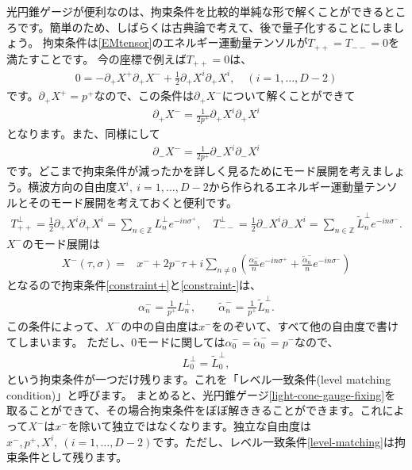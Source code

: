 \documentclass[report,paper=a4, fontsize=12pt, line_length=16cm, number_of_lines=33,dvipdfmx]{jlreq}
\numberwithin{equation}{chapter}
\numberwithin{equation}{section}
\newcommand{\Zb}{\mathbb{Z}}
\newcommand{\del}{\partial}
\newcommand{\alphat}{\tilde{\alpha}}
\newcommand{\Lp}{L^{\perp}}
\newcommand{\Ltp}{\widetilde{L}^{\perp}}
\begin{document}
光円錐ゲージが便利なのは、拘束条件を比較的単純な形で解くことができるところです。簡単のため、しばらくは古典論で考えて、後で量子化することにしましょう。
拘束条件は\eqref{EMtensor}のエネルギー運動量テンソルが$T_{++}=T_{--}=0$を満たすことです。
今の座標で例えば$T_{++}=0$は、
\begin{align}
0=-\del_{+}X^{+}\del_{+}X^{-}+\frac12 \del_{+}X^{i}\del_{+}X^{i},\quad(i=1,\dots,D-2)
\end{align}
です。$\del_{+}X^{+}=p^{+}$なので、この条件は$\del_{+}X^{-}$について解くことができて
\begin{align}
\del_{+}X^{-}=\frac{1}{2p^{+}}\del_{+}X^{i}\del_{+}X^{i}
\label{constraint+}
\end{align}
となります。また、同様にして
\begin{align}
\del_{-}X^{-}=\frac{1}{2p^{+}}\del_{-}X^{i}\del_{-}X^{i}
\label{constraint-}
\end{align}
です。どこまで拘束条件が減ったかを詳しく見るためにモード展開を考えましょう。横波方向の自由度$X^{i},\ i=1,\dots, D-2$から作られるエネルギー運動量テンソルとそのモード展開を考えておくと便利です。
\begin{align}
T^{\perp}_{++}=\frac{1}{2}\del_{+}X^{i}\del_{+}X^{i}=\sum_{n\in\Zb}\Lp_{n}e^{-in\sigma^{+}},\quad
T^{\perp}_{--}=\frac{1}{2}\del_{-}X^{i}\del_{-}X^{i}=\sum_{n\in\Zb}\Ltp_{n}e^{-in\sigma^{-}}.
\end{align}
$X^{-}$のモード展開は
\begin{align}
X^{-}(\tau,\sigma)=&x^{-}+2p^{-}\tau+i\sum_{n\ne 0} \left(
\frac{\alpha^{-}_{n}}{n}e^{-in\sigma^{+}}
+\frac{\alphat^{-}_{n}}{n}e^{-in\sigma^{-}}
\right)
\end{align}
となるので拘束条件\eqref{constraint+}と\eqref{constraint-}は、
\begin{align}
\alpha_n^{-}=\frac{1}{p^{+}} \Lp_{n},\qquad
\alphat_n^{-}=\frac{1}{p^{+}} \Ltp_{n}.\label{solution-constraint}
\end{align}
この条件によって、$X^{-}$の中の自由度は$x^{-}$をのぞいて、すべて他の自由度で書けてしまいます。
ただし、0モードに関しては$\alpha_0^{-}=\alphat_0^{-}=p^{-}$なので、
\begin{align}
\Lp_{0}=\Ltp_{0},\label{level-matching}
\end{align}
という拘束条件が一つだけ残ります。これを「レベル一致条件(level matching condition)」と呼びます。
まとめると、光円錐ゲージ\eqref{light-cone-gauge-fixing}を取ることができて、その場合拘束条件をぼぼ解ききることができます。これによって$X^{-}$は$x^{-}$を除いて独立ではなくなります。独立な自由度は
$x^{-},p^{+}, X^{i},\ (i=1,\dots,D-2)$です。ただし、レベル一致条件\eqref{level-matching}は拘束条件として残ります。
\end{document}
